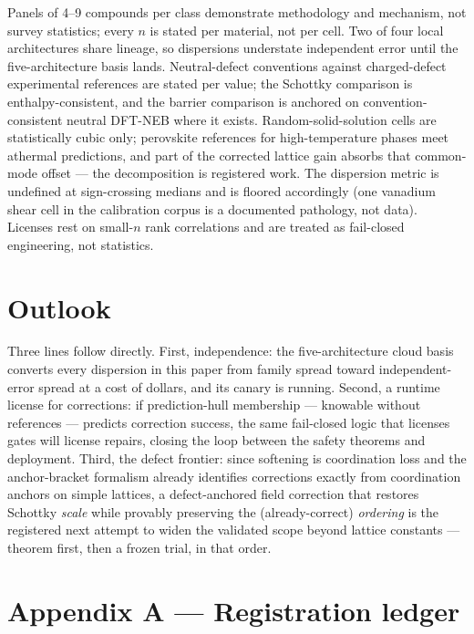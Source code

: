 \documentclass[11pt]{article}
\theoremstyle{definition}
\theoremstyle{remark}
\begin{document}
Panels of 4--9 compounds per class demonstrate methodology and mechanism, not survey statistics; every $n$ is stated per material, not per cell. Two of four local architectures share lineage, so dispersions understate independent error until the five-architecture basis lands. Neutral-defect conventions against charged-defect experimental references are stated per value; the Schottky comparison is enthalpy-consistent, and the barrier comparison is anchored on convention-consistent neutral DFT-NEB where it exists. Random-solid-solution cells are statistically cubic only; perovskite references for high-temperature phases meet athermal predictions, and part of the corrected lattice gain absorbs that common-mode offset --- the decomposition is registered work. The dispersion metric is undefined at sign-crossing medians and is floored accordingly (one vanadium shear cell in the calibration corpus is a documented pathology, not data). Licenses rest on small-$n$ rank correlations and are treated as fail-closed engineering, not statistics.

\section*{Outlook}

Three lines follow directly. First, independence: the five-architecture cloud basis converts every dispersion in this paper from family spread toward independent-error spread at a cost of dollars, and its canary is running. Second, a runtime license for corrections: if prediction-hull membership --- knowable without references --- predicts correction success, the same fail-closed logic that licenses gates will license repairs, closing the loop between the safety theorems and deployment. Third, the defect frontier: since softening is coordination loss and the anchor-bracket formalism already identifies corrections exactly from coordination anchors on simple lattices, a defect-anchored field correction that restores Schottky \emph{scale} while provably preserving the (already-correct) \emph{ordering} is the registered next attempt to widen the validated scope beyond lattice constants --- theorem first, then a frozen trial, in that order.

\section*{Appendix A --- Registration ledger}
\end{document}
